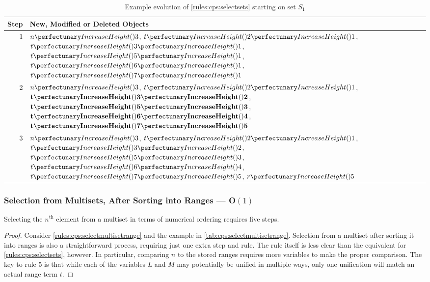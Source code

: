 \begin{table} \centering
   \begin{tabular}{|r|l|}
    \hline
    \textbf{Step} & \textbf{New, Modified or Deleted Objects} \\ \hline
    1 & \(\cpfunc{n}{3}\), \(\cpfuncn{t}{2}{1}\), \(\cpfuncn{t}{3}{1}\), \(\cpfuncn{t}{5}{1}\), \(\cpfuncn{t}{6}{1}\), \(\cpfuncn{t}{7}{1}\)\\ \hline
    
    2 & \(\cpfunc{n}{3}\), \(\cpfuncn{t}{2}{1}\), \(\mathbf{\cpfuncn{t}{3}{2}}\), \(\mathbf{\cpfuncn{t}{5}{3}}\), \(\mathbf{\cpfuncn{t}{6}{4}}\), \(\mathbf{\cpfuncn{t}{7}{5}}\)\\ \hline
    
    3 & \(\cpfunc{n}{3}\), \(\cpfuncn{t}{2}{1}\), \(\cpfuncn{t}{3}{2}\), \(\cpfuncn{t}{5}{3}\), \(\cpfuncn{t}{6}{4}\), \(\cpfuncn{t}{7}{5}\), \(\cpfunc{r}{5}\)\\ \hline

\end{tabular} 
\caption[Example evolution of \cref{rules:cps:selectsets}]{\label{tab:cps:selectsets}Example evolution of \cref{rules:cps:selectsets} starting on set \(S_1\)}
\end{table}

\subsubsection{Selection from Multisets, After Sorting into Ranges --- O\((1)\)}\label{sec:cps:selectmultisetrange}

\begin{proposition}\label{prop:cps:selectmultisetrange}
Selecting the \(n^{\text{th}}\) element from a multiset in terms of numerical ordering requires five steps.
\end{proposition}

\begin{proof}
Consider \cref{rules:cps:selectmultisetrange} and the example in \cref{tab:cps:selectmultisetrange}.  Selection from a multiset after sorting it into ranges is also a straightforward process, requiring just one extra step and rule.  The rule itself is less clear than the equivalent for \cref{rules:cps:selectsets}, however.  In particular, comparing \(n\) to the stored ranges requires more variables to make the proper comparison.  The key to rule 5 is that while each of the variables \(L\) and \(M\) may potentially be unified in multiple ways, only one unification will match an actual range term \(t\).  
\end{proof}

